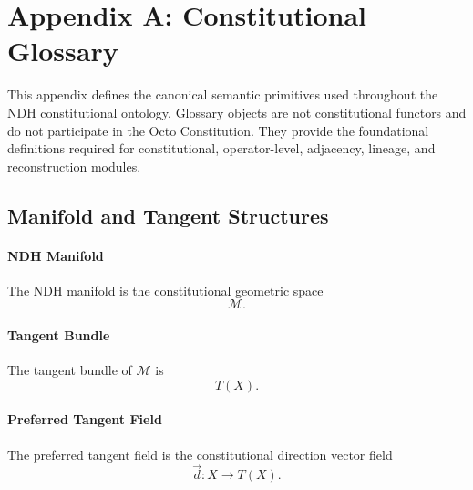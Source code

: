 
\appendix

\section{Appendix A: Constitutional Glossary}
\label{sec:appendix-glossary}

This appendix defines the canonical semantic primitives used throughout the
NDH constitutional ontology. Glossary objects are not constitutional functors
and do not participate in the Octo Constitution. They provide the foundational
definitions required for constitutional, operator-level, adjacency, lineage,
and reconstruction modules.


\subsection{Manifold and Tangent Structures}

\paragraph{NDH Manifold}
The NDH manifold is the constitutional geometric space
\[
\mathcal{M}.
\]

\paragraph{Tangent Bundle}
The tangent bundle of $\mathcal{M}$ is
\[
T(X).
\]

\paragraph{Preferred Tangent Field}
The preferred tangent field is the constitutional direction vector field
\[
\vec{d} : X \to T(X).
\]


